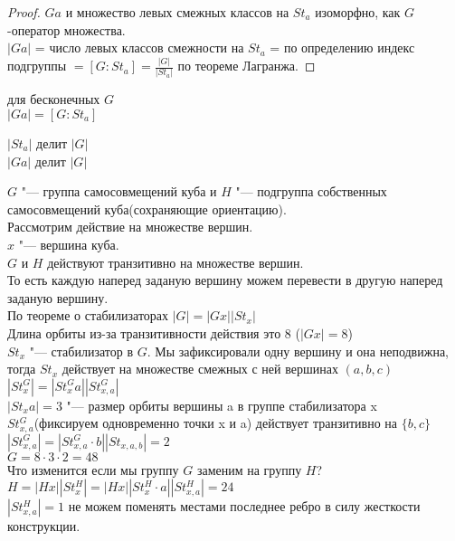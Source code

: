 \begin{proof}
$Ga$ и множество левых смежных классов на $St_a$ изоморфно, как $G$-оператор
множества.\\
$|Ga|$ = число левых классов смежности на $St_a$ = по определению индекс подгруппы
$= [G \colon St_a] = \frac{|G|}{|St_a|}$ по теореме Лагранжа.
\end{proof}
\begin{Rem}
для бесконечных $G$\\
$|Ga| = [G \colon St_a]$\\
\end{Rem}
\begin{conseq}
$|St_a|$ делит $|G|$\\
$|Ga|$ делит $|G|$\\
\end{conseq}
\begin{exmp}
$G$ "--- группа самосовмещений куба и $H$ "--- подгруппа собственных самосовмещений куба(сохраняющие ориентацию).\\
Рассмотрим действие на множестве вершин.\\
$x$ "--- вершина куба.\\
$G$ и $H$ действуют транзитивно на множестве вершин.\\
То есть каждую наперед заданую вершину можем перевести в другую наперед заданую вершину.\\
По теореме о стабилизаторах $|G| = |Gx||St_x|$\\
Длина орбиты из-за транзитивности действия это 8 ($|Gx| = 8$)\\
$St_x$ "--- стабилизатор в $G$. Мы зафиксировали одну вершину и она неподвижна, тогда
$St_x$ действует на множестве смежных с ней вершинах $(a, b, c)$\\
$|St_x^{G}| = |St_x^{G}a||St_{x, a}^{G}|$\\
$|St_x a| = 3$ "--- размер орбиты вершины a в группе стабилизатора x\\
$St_{x, a}^{G}$(фиксируем одновременно точки x и a) действует транзитивно на $\{b, c\}$\\
$|St_{x, a}^{G}| = |St_{x, a}^{G}\cdot b||St_{x, a, b}| = 2$\\
$G = 8 \cdot 3 \cdot 2 = 48$\\
Что изменится если мы группу $G$ заменим на группу $H$?
$H = |Hx||St_x^{H}| = |Hx||St_x^{H}\cdot a||St_{x,a}^{H}| = 24$\\
$|St_{x,a}^{H}| = 1$ не можем поменять местами последнее ребро в силу жесткости конструкции. 
\end{exmp}
